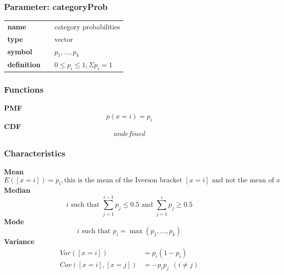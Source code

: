 \subsubsection*{Parameter: categoryProb}

\noindent\begin{tabular}{p{2cm}cl}
\textbf{name} & & category probabilities \\
\textbf{type} & & vector \\
\textbf{symbol} & & $p_1, \ldots, p_k$  \\
\textbf{definition} & & $0 \leq p_i \leq 1, \Sigma p_i = 1$
\end{tabular}
\subsubsection*{Functions}

\smallskip \noindent \hspace{.2cm} \textbf{PMF} 
\begin{equation*}p(x=i)=p_i\end{equation*}
\smallskip \noindent \hspace{.2cm} \textbf{CDF} 
\begin{equation*}undefined\end{equation*}
\smallskip
\subsubsection*{Characteristics}
\smallskip \noindent \hspace{.2cm} \textbf{Mean} 
\begin{equation*}E([x=i]) = p_i, \text{this is the mean of the Iverson bracket } [x=i] \text{ and not the mean of } x\end{equation*}
\smallskip \noindent \hspace{.2cm} \textbf{Median} 
\begin{equation*}i\text{ such that }\sum_{j=1}^{i-1} p_j \leq 0.5\text{ and }\sum_{j=1}^{i} p_j \geq 0.5\end{equation*}
\smallskip \noindent \hspace{.2cm} \textbf{Mode} 
\begin{equation*}i\text{ such that }p_i=\max(p_1, \ldots, p_k)\end{equation*}
\smallskip \noindent \hspace{.2cm} \textbf{Variance} 
\begin{align*}
Var([x=i]) &= p_i (1-p_i) \\ 
Cov([x=i],[x=j]) &= - p_i p_j~~(i\neq j)\end{align*}
\smallskip

